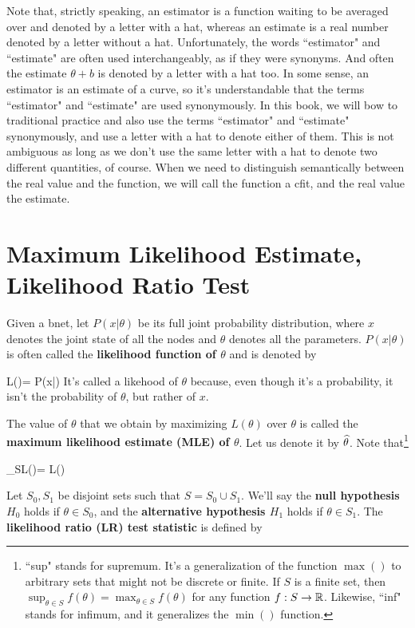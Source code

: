 Note that, strictly
speaking, an estimator is a function
waiting to be averaged over
and denoted by a letter with a hat,
whereas an estimate is a real number
denoted by a letter without a hat.
Unfortunately, the
words ``estimator" and
``estimate" are often used interchangeably,
as if they were synonyms.
And often the estimate $\theta + b$
is denoted by a letter with a hat too.
In some sense, an estimator is an estimate
of a curve, so it's understandable that
the terms ``estimator" and ``estimate"
are used synonymously.
In this book, we will bow to traditional
practice and
also use
the terms ``estimator" and ``estimate"
synonymously, and use a letter
with a hat to denote either of them.
This is not
ambiguous as long as we don't
use the same letter with a
hat to denote two different quantities, of course.
When we need to distinguish semantically
between the real value and the function,
we will call the function a cfit,
and the real value the estimate.

\section{Maximum Likelihood Estimate,
Likelihood Ratio Test}
\label{sec0-likelihood-ratio}

Given a bnet, let $P(x|\theta)$
be its full joint probability distribution,
where
$x$ denotes the joint state
of all the nodes and $\theta$
denotes all the parameters.
 $P(x|\theta)$ is often
called the {\bf likelihood function of $\theta$}
and is denoted by

\beq
L(\theta)= P(x|\theta)
\eeq
It's called a likehood of $\theta$
because, even though it's a probability,
it isn't the probability of $\theta$,
but rather of $x$.

The value of $\theta$
that we obtain by maximizing $L(\theta)$
over $\theta$ is called
the
{\bf maximum likelihood
estimate (MLE) of $\theta$}. Let us denote it by
$\widehat{\theta}$. Note that\footnote{``sup" stands for supremum.
It's a generalization of the function $\max()$
to arbitrary sets
that might not be discrete or finite.
If $S$ is a
finite set,
then $\sup_{\theta\in S} f(\theta)=
\max_{\theta\in S} f(\theta)$
for any function $f:S\rightarrow { \mathbb{R}}$.
Likewise, ``inf" stands for infimum,
and it generalizes the $\min()$ function.}

\beq
\sup_{\theta\in S}L(\theta)=
L(\HAT{\theta})
\eeq


Let $S_0, S_1$ be disjoint sets such that
 $S=S_0\cup S_1$.
We'll say
the {\bf null hypothesis $H_0$} holds
 if $\theta\in S_0$,
and the {\bf alternative hypothesis $H_1$}
holds if
$\theta\in S_1$.
The {\bf likelihood ratio (LR) test statistic}
is defined by


